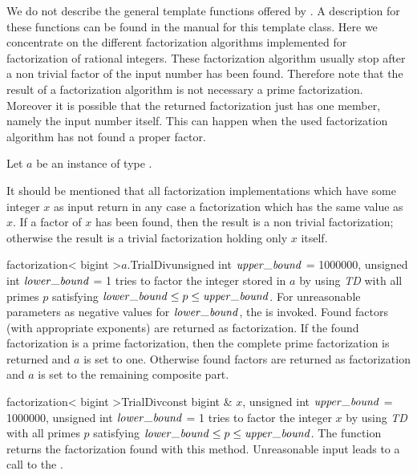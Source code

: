 We do not describe the general template functions offered by .  A
description for these functions can be found in the manual for this template class.  Here we
concentrate on the different factorization algorithms implemented for factorization of rational
integers.  These factorization algorithm usually stop after a non trivial factor of the input
number has been found.  Therefore note that the result of a factorization algorithm is not
necessary a prime factorization.  Moreover it is possible that the returned factorization just
has one member, namely the input number itself.  This can happen when the used factorization
algorithm has not found a proper factor.




Let $a$ be an instance of type .

It should be mentioned that all factorization implementations which have some integer $x$ as
input return in any case a factorization which has the same value as $x$.  If a factor of $x$
has been found, then the result is a non trivial factorization; otherwise the result is a
trivial factorization holding only $x$ itself.

\begin{fcode}{factorization< bigint >}{$a$.TrialDiv}{unsigned int $\upperbound$ = 1000000,
    unsigned int $\lowerbound$ = 1}%
  tries to factor the integer stored in $a$ by using \emph{TD} with all primes $p$ satisfying
  $\lowerbound \leq p \leq \upperbound$.  For unreasonable parameters as negative values for
  $\lowerbound$, the \LEH is invoked.  Found factors (with appropriate exponents) are returned
  as factorization.  If the found factorization is a prime factorization, then the complete
  prime factorization is returned and $a$ is set to one.  Otherwise found factors are returned
  as factorization and $a$ is set to the remaining composite part.
\end{fcode}

\begin{fcode}{factorization< bigint >}{TrialDiv}{const bigint & $x$, unsigned int $\upperbound$ = 1000000,
    unsigned int $\lowerbound$ = 1}%
  tries to factor the integer $x$ by using \emph{TD} with all primes $p$ satisfying $\lowerbound
  \leq p \leq \upperbound$.  The function returns the factorization found with this method.
  Unreasonable input leads to a call to the \LEH.
\end{fcode}

